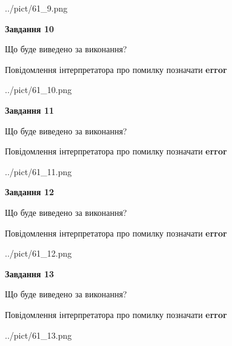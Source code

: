 \documentclass[11pt, ukrainian]{article}
\begin{document}
{\begin {large}
\begin{center}
	{../pict/61_9.png}
\end{center}
\newpage

{\begin {center}\textbf{Завдання 10}\end {center}}\par
Що буде виведено за виконання? \par
Повідомлення інтерпретатора про помилку позначати \textbf{error}

\begin{center}
	{../pict/61_10.png}
\end{center}
\newpage

{\begin {center}\textbf{Завдання 11}\end {center}}\par
Що буде виведено за виконання? \par
Повідомлення інтерпретатора про помилку позначати \textbf{error}

\begin{center}
	{../pict/61_11.png}
\end{center}
\newpage

{\begin {center}\textbf{Завдання 12}\end {center}}\par
Що буде виведено за виконання? \par
Повідомлення інтерпретатора про помилку позначати \textbf{error}

\begin{center}
	{../pict/61_12.png}
\end{center}
\newpage

{\begin {center}\textbf{Завдання 13}\end {center}}\par
Що буде виведено за виконання? \par
Повідомлення інтерпретатора про помилку позначати \textbf{error}

\begin{center}
	{../pict/61_13.png}
\end{center}
\newpage


\end{large}}
\end{document}
